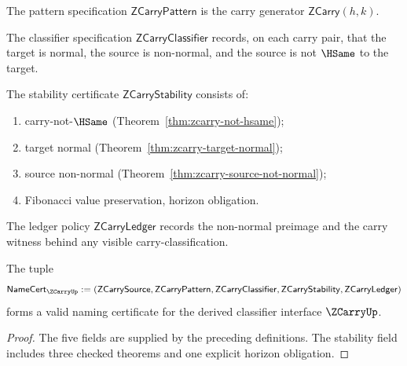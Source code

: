 \begin{definition}
\label{def:zcarry-pattern-specification}
The pattern specification \(\mathsf{ZCarryPattern}\) is the carry generator \(\mathsf{ZCarry}(h, k)\).
\end{definition}

\begin{definition}
\label{def:zcarry-classifier-specification}
The classifier specification \(\mathsf{ZCarryClassifier}\) records, on each carry pair, that the target is normal, the source is non-normal, and the source is not \(\HSame\) to the target.
\end{definition}

\begin{definition}
\label{def:zcarry-stability-certificate}
The stability certificate \(\mathsf{ZCarryStability}\) consists of:
\begin{enumerate}
  \item carry-not-\(\HSame\) (Theorem~\ref{thm:zcarry-not-hsame});
  \item target normal (Theorem~\ref{thm:zcarry-target-normal});
  \item source non-normal (Theorem~\ref{thm:zcarry-source-not-normal});
  \item Fibonacci value preservation, horizon obligation.
\end{enumerate}
\end{definition}

\begin{definition}
\label{def:zcarry-ledger-policy}
The ledger policy \(\mathsf{ZCarryLedger}\) records the non-normal preimage and the carry witness behind any visible carry-classification.
\end{definition}

\begin{theorem}
\label{thm:concrete-zcarry-namecert}
The tuple
$$
  \mathsf{NameCert}_{\ZCarryUp}
  :=
  (\mathsf{ZCarrySource},
   \mathsf{ZCarryPattern},
   \mathsf{ZCarryClassifier},
   \mathsf{ZCarryStability},
   \mathsf{ZCarryLedger})
$$
forms a valid naming certificate for the derived classifier interface \(\ZCarryUp\).
\end{theorem}
\begin{proof}
The five fields are supplied by the preceding definitions. The stability field includes three checked theorems and one explicit horizon obligation.
\end{proof}

